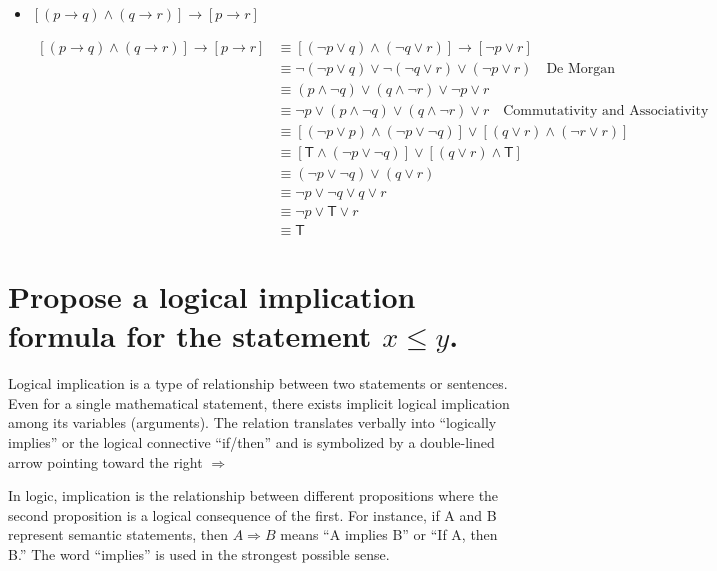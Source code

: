 \documentclass{article}
\begin{document}
\begin{itemize}
  \item $[(p \to q) \land (q \to r)] \to [p \to r]$
  
\begin{equation*}
  \begin{aligned}
    [(p \to q) \land (q \to r)] \to [p \to r] &\equiv [(\lnot p \lor q) \land (\lnot q \lor r)] \to [\lnot p \lor r] \\
    &\equiv \lnot(\lnot p \lor q) \lor \lnot(\lnot q \lor r) \lor (\lnot p \lor r) \quad \text{De Morgan} \\
    &\equiv (p \land \lnot q) \lor (q \land \lnot r) \lor \lnot p \lor r \\
    &\equiv \lnot p \lor (p \land \lnot q) \lor (q \land \lnot r) \lor r  \quad \text{Commutativity and Associativity}\\
    &\equiv [(\lnot p \lor p) \land (\lnot p \lor \lnot q)] \lor [(q \lor r) \land (\lnot r \lor r)] \\
    &\equiv [\mathsf{T} \land (\lnot p \lor \lnot q)] \lor [(q \lor r) \land \mathsf{T}] \\
    &\equiv (\lnot p \lor \lnot q) \lor (q \lor r)  \\
    &\equiv \lnot p \lor \lnot q \lor q \lor r  \\
    &\equiv \lnot p \lor \mathsf{T} \lor r  \\
    &\equiv \mathsf{T}
  \end{aligned}
\end{equation*}

\end{itemize}

\section{Propose a logical implication formula for the statement $x \leq y$.}

Logical implication is a type of relationship between two statements or sentences. Even for a single mathematical statement, there exists implicit logical implication among its variables (arguments). The relation translates verbally into “logically implies” or the logical connective “if/then” and is symbolized by a double-lined arrow pointing toward the right $\Longrightarrow $

In logic, implication is the relationship between different propositions where the second proposition is a logical consequence of the first. For instance, if A and B represent semantic statements, then $A \Longrightarrow B$ means “A implies B” or “If A, then B.” The word “implies” is used in the strongest possible sense.
\end{document}
